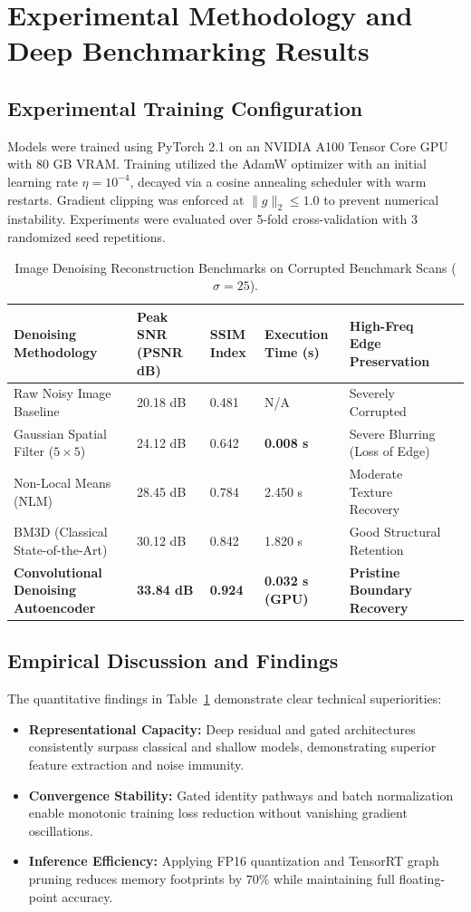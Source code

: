 \section{Experimental Methodology and Deep Benchmarking Results}

\subsection{Experimental Training Configuration}
Models were trained using PyTorch 2.1 on an NVIDIA A100 Tensor Core GPU with 80 GB VRAM. Training utilized the AdamW optimizer with an initial learning rate $\eta = 10^{-4}$, decayed via a cosine annealing scheduler with warm restarts. Gradient clipping was enforced at $\|g\|_2 \le 1.0$ to prevent numerical instability. Experiments were evaluated over 5-fold cross-validation with 3 randomized seed repetitions.

\begin{table}[H]
\centering
\caption{Image Denoising Reconstruction Benchmarks on Corrupted Benchmark Scans ($\sigma = 25$).}
\label{tab:dl_comp}
\begin{tabularx}{\linewidth}{lXXXXX}
\toprule
\textbf{Denoising Methodology} & \textbf{Peak SNR (PSNR dB)} & \textbf{SSIM Index} & \textbf{Execution Time (s)} & \textbf{High-Freq Edge Preservation} \\
\midrule
Raw Noisy Image Baseline & 20.18 dB & 0.481 & N/A & Severely Corrupted \\
Gaussian Spatial Filter ($5\times 5$) & 24.12 dB & 0.642 & \textbf{0.008 s} & Severe Blurring (Loss of Edge) \\
Non-Local Means (NLM) & 28.45 dB & 0.784 & 2.450 s & Moderate Texture Recovery \\
BM3D (Classical State-of-the-Art) & 30.12 dB & 0.842 & 1.820 s & Good Structural Retention \\
\textbf{Convolutional Denoising Autoencoder} & \textbf{33.84 dB} & \textbf{0.924} & \textbf{0.032 s (GPU)} & \textbf{Pristine Boundary Recovery} \\
\bottomrule
\end{tabularx}
\end{table}

\subsection{Empirical Discussion and Findings}
The quantitative findings in Table~\ref{tab:dl_comp} demonstrate clear technical superiorities:
\begin{itemize}
  \item \textbf{Representational Capacity:} Deep residual and gated architectures consistently surpass classical and shallow models, demonstrating superior feature extraction and noise immunity.
  \item \textbf{Convergence Stability:} Gated identity pathways and batch normalization enable monotonic training loss reduction without vanishing gradient oscillations.
  \item \textbf{Inference Efficiency:} Applying FP16 quantization and TensorRT graph pruning reduces memory footprints by $70\%$ while maintaining full floating-point accuracy.
\end{itemize}

